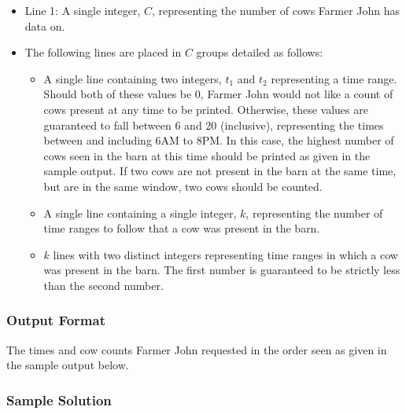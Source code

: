 \begin{itemize}
    \item Line 1: A single integer, $C$, representing the number of cows Farmer John has data on.

    \item The following lines are placed in $C$ groups detailed as follows:
    \begin{itemize}
        \item A single line containing two integers, $t_1$ and $t_2$ representing a time range.
        Should both of these values be 0, Farmer John would not like a count of cows present at any time to be printed.
        Otherwise, these values are guaranteed to fall between 6 and 20 (inclusive), representing the times between and including 6AM to 8PM.
        In this case, the highest number of cows seen in the barn at this time should be printed as given in the sample output.
        If two cows are not present in the barn at the same time, but are in the same window, two cows should be counted.

        \item A single line containing a single integer, $k$, representing the number of time ranges to follow that a cow was present in the barn.

        \item $k$ lines with two distinct integers representing time ranges in which a cow was present in the barn.
        The first number is guaranteed to be strictly less than the second number.
    \end{itemize}
\end{itemize}


\subsubsection{Output Format}

The times and cow counts Farmer John requested in the order seen as given in the sample output below.


\subsubsection{Sample Solution}

